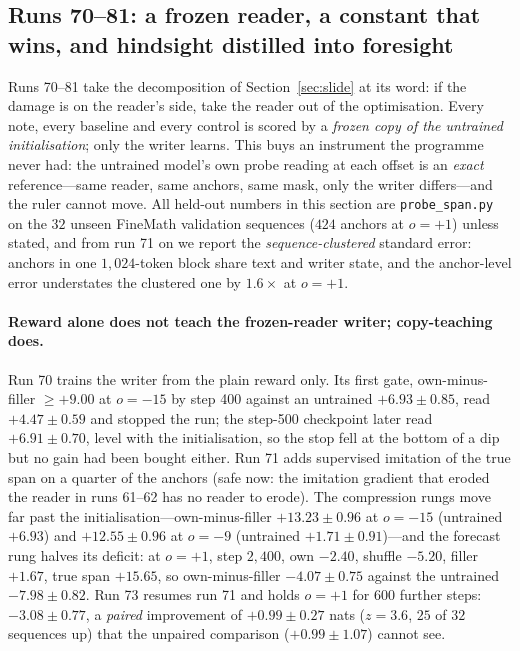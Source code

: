 \documentclass{article} %
\begin{document}
\subsection{Runs 70--81: a frozen reader, a constant that wins, and hindsight distilled into foresight}
\label{sec:frozen}

Runs 70--81 take the decomposition of Section~\ref{sec:slide} at its word: if the damage is on the
reader's side, take the reader out of the optimisation. Every note, every baseline and every control is
scored by a \emph{frozen copy of the untrained initialisation}; only the writer learns. This buys an
instrument the programme never had: the untrained model's own probe reading at each offset is an
\emph{exact} reference---same reader, same anchors, same mask, only the writer differs---and the ruler
cannot move. All held-out numbers in this section are \texttt{probe\_span.py} on the $32$ unseen FineMath
validation sequences ($424$ anchors at $o=+1$) unless stated, and from run 71 on we report the
\emph{sequence-clustered} standard error: anchors in one $1{,}024$-token block share text and writer state,
and the anchor-level error understates the clustered one by $1.6\times$ at $o=+1$.

\paragraph{Reward alone does not teach the frozen-reader writer; copy-teaching does.} Run 70 trains the
writer from the plain reward only. Its first gate, own-minus-filler $\ge +9.00$ at $o=-15$ by step 400
against an untrained $+6.93 \pm 0.85$, read $+4.47 \pm 0.59$ and stopped the run; the step-500 checkpoint
later read $+6.91 \pm 0.70$, level with the initialisation, so the stop fell at the bottom of a dip but no
gain had been bought either. Run 71 adds supervised imitation of the true span on a quarter of the anchors
(safe now: the imitation gradient that eroded the reader in runs 61--62 has no reader to erode). The
compression rungs move far past the initialisation---own-minus-filler $+13.23 \pm 0.96$ at $o=-15$ (untrained
$+6.93$) and $+12.55 \pm 0.96$ at $o=-9$ (untrained $+1.71 \pm 0.91$)---and the forecast rung halves its
deficit: at $o=+1$, step $2{,}400$, own $-2.40$, shuffle $-5.20$, filler $+1.67$, true span $+15.65$, so
own-minus-filler $-4.07 \pm 0.75$ against the untrained $-7.98 \pm 0.82$. Run 73 resumes run 71 and holds
$o=+1$ for $600$ further steps: $-3.08 \pm 0.77$, a \emph{paired} improvement of $+0.99 \pm 0.27$ nats
($z = 3.6$, $25$ of $32$ sequences up) that the unpaired comparison ($+0.99 \pm 1.07$) cannot see.
\end{document}
